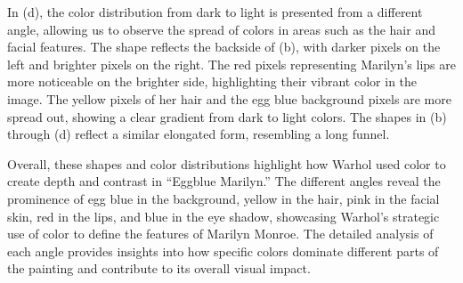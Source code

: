 \documentclass{article}
\begin{document}
In (d), the color distribution from dark to light is presented from a
different angle, allowing us to observe the spread of colors in areas
such as the hair and facial features. The shape reflects the backside of
(b), with darker pixels on the left and brighter pixels on the right.
The red pixels representing Marilyn's lips are more noticeable on the
brighter side, highlighting their vibrant color in the image. The yellow
pixels of her hair and the egg blue background pixels are more spread
out, showing a clear gradient from dark to light colors. The shapes in
(b) through (d) reflect a similar elongated form, resembling a long
funnel.

Overall, these shapes and color distributions highlight how Warhol used
color to create depth and contrast in ``Eggblue Marilyn.'' The different
angles reveal the prominence of egg blue in the background, yellow in
the hair, pink in the facial skin, red in the lips, and blue in the eye
shadow, showcasing Warhol's strategic use of color to define the
features of Marilyn Monroe. The detailed analysis of each angle provides
insights into how specific colors dominate different parts of the
painting and contribute to its overall visual impact.
\end{document}
